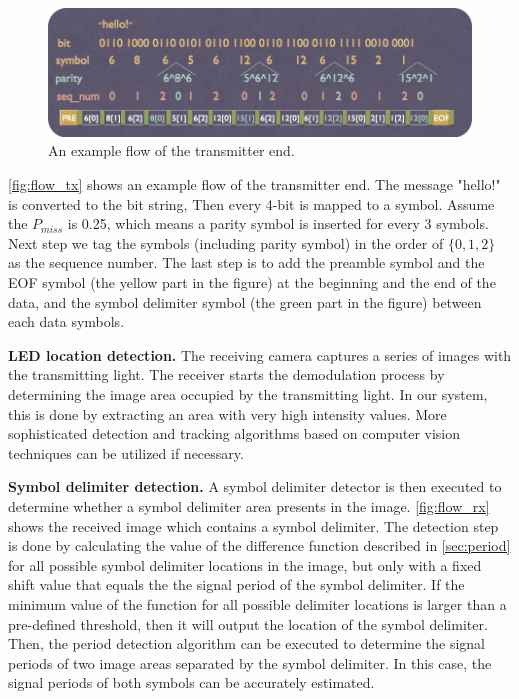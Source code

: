 
\begin{figure}[!htb]
  \centering
  \includegraphics[scale=0.25]{fig/flow_tx.png} 
  \caption{An example flow of the transmitter end.}
  \label{fig:flow_tx}
\end{figure}

\autoref{fig:flow_tx} shows an example flow of the transmitter end. The message "hello!" is converted to the bit string, Then every 4-bit is mapped to a symbol. Assume the $P_{miss}$ is 0.25, which means a parity symbol is inserted for every 3 symbols. Next step we tag the symbols (including parity symbol) in the order of $\{0,1,2\}$ as the sequence number. The last step is to add the preamble symbol and the EOF symbol (the yellow part in the figure) at the beginning and the end of the data, and the symbol delimiter symbol (the green part in the figure) between each data symbols. 

\textbf{LED location detection.} The receiving camera captures a series of images with the transmitting light. The receiver starts the demodulation process by determining the image area occupied by the transmitting light. In our system, this is done by extracting an area with very high intensity values. More sophisticated detection and tracking algorithms based on computer vision techniques can be utilized if necessary.

\textbf{Symbol delimiter detection.}
A symbol delimiter detector is then executed to determine whether a symbol delimiter area presents in the image. \autoref{fig:flow_rx} shows the received image which contains a symbol delimiter. The detection step is done by calculating the value of the difference function described in \autoref{sec:period} for all possible symbol delimiter locations in the image, but only with a fixed shift value that equals the the signal period of the symbol delimiter. If the minimum value of the function for all possible delimiter locations is larger than a pre-defined threshold, then it will output the location of the symbol delimiter. Then, the period detection algorithm can be executed to determine the signal periods of two image areas separated by the symbol delimiter. In this case, the signal periods of both symbols can be accurately estimated.


